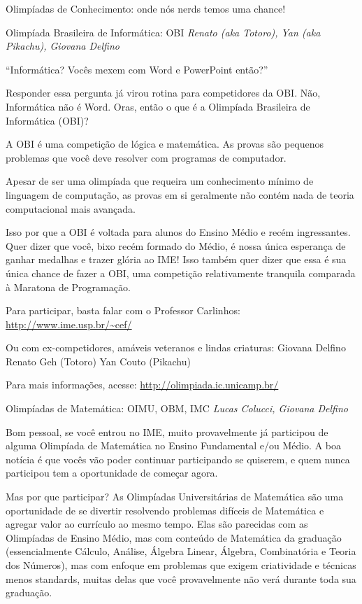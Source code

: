\begin{secao}{Olimpíadas de Conhecimento: onde nós nerds temos uma chance!}

\begin{subsecao}{Olimpíada Brasileira de Informática: OBI}
{\em Renato (aka Totoro), Yan (aka Pikachu), Giovana Delfino} %

``Informática? Vocês mexem com Word e PowerPoint então?''

Responder essa pergunta já virou rotina para competidores da
OBI. Não, Informática não é Word. Oras, então o que é a 
Olimpíada Brasileira de Informática (OBI)?

A OBI é uma competição de lógica e matemática. As provas são pequenos
problemas que você deve resolver com programas de computador.

Apesar de ser uma olimpíada que requeira um conhecimento mínimo de 
linguagem de computação, as provas em si geralmente não contém nada 
de teoria computacional mais avançada. 

Isso por que a OBI é voltada para alunos do Ensino Médio e recém
ingressantes. Quer dizer que você, bixo recém formado do Médio,
é nossa única esperança de ganhar medalhas e trazer glória ao IME!
Isso também quer dizer que essa é sua única chance de fazer a OBI,
uma competição relativamente tranquila comparada à Maratona de 
Programação.

Para participar, basta falar com o Professor Carlinhos:
\url{http://www.ime.usp.br/~cef/}

Ou com ex-competidores, amáveis veteranos e lindas criaturas:
Giovana Delfino
Renato Geh (Totoro)
Yan Couto (Pikachu)

Para mais informações, acesse:
\url{http://olimpiada.ic.unicamp.br/}

\end{subsecao}

\begin{subsecao}{Olimpíadas de Matemática: OIMU, OBM, IMC}
{\em Lucas Colucci, Giovana Delfino} %

Bom pessoal, se você entrou no IME, muito provavelmente já participou
de alguma Olimpíada de Matemática no Ensino Fundamental e/ou Médio. A 
boa notícia é que vocês vão poder continuar participando se quiserem,
e quem nunca participou tem a oportunidade de começar agora.

Mas por que participar? As Olimpíadas Universitárias de Matemática são uma
oportunidade de se divertir resolvendo problemas difíceis de Matemática e agregar
valor ao currículo ao mesmo tempo. Elas são parecidas com as Olimpíadas de
Ensino Médio, mas com conteúdo de Matemática da graduação (essencialmente 
Cálculo, Análise, Álgebra Linear, Álgebra, Combinatória e Teoria dos Números), 
mas com enfoque em problemas que exigem criatividade e técnicas menos standards,
muitas delas que você provavelmente não verá durante toda sua graduação.


\end{subsecao}
\end{secao}
